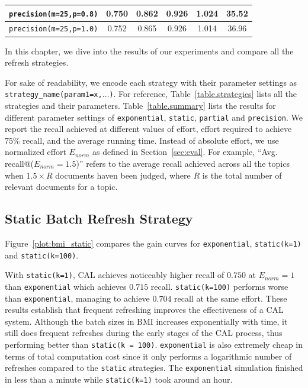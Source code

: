 \begin{table}[]
{\begin{tabular}{|c|c|c|c|c|c|}
\texttt{precision(m=25,p=0.8)} &  0.750 & 0.862 & 0.926 & 1.024 & 35.52 \\ \hline
\texttt{precision(m=25,p=1.0)} &  0.752 & 0.865 & 0.926 & 1.014 & 36.96 \\
\hline
\end{tabular}
}
\end{table}

In this chapter, we dive into the results of our experiments and compare
all the refresh strategies.

For sake of readability, we encode each strategy with their parameter
settings as \texttt{strategy\_name(param1=x,$\ldots$)}. For reference, Table~\ref{table.strategies}
lists all the strategies and their parameters. Table~\ref{table.summary} lists
the results for different parameter settings of \texttt{exponential}, \texttt{static},
\texttt{partial} and \texttt{precision}.
We report the recall achieved at different values of effort, effort required to
achieve $75\%$ recall, and the average running time. Instead of absolute effort,
we use normalized effort $E_{norm}$ as defined in Section~\ref{sec:eval}. For
example, ``Avg. recall@($E_{norm}=1.5$)'' refers to the average recall achieved
across all the topics when $1.5 \times R$ documents haven been judged, where $R$
is the total number of relevant documents for a topic.

\subsection*{Static Batch Refresh Strategy}
Figure~\ref{plot:bmi_static} compares the gain curves for \texttt{exponential},
\texttt{static(k=1)} and \texttt{static(k=100)}.

With \texttt{static(k=1)}, CAL achieves noticeably higher recall of
$0.750$ at $E_{norm} = 1$ than \texttt{exponential} which achieves $0.715$
recall.  \texttt{static(k=100)} performs worse than
\texttt{exponential}, managing to achieve $0.704$ recall at the same effort.
These results establish that frequent refreshing improves the effectiveness of a
CAL system.
Although the batch sizes in BMI increases exponentially with time, it still does
frequent refreshes during the early stages of the CAL process, thus performing
better than \texttt{static(k = 100)}. \texttt{exponential} is also
extremely cheap in terms of total computation cost since it only performs a
logarithmic number of refreshes compared to the \texttt{static} strategies.
The \texttt{exponential} simulation finished in less than a minute while
\texttt{static(k=1)} took around an hour.

